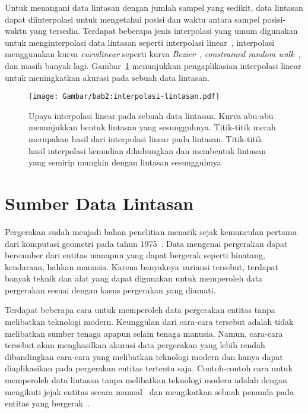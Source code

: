Untuk menangani data lintasan dengan jumlah sampel yang sedikit, data lintasan dapat diinterpolasi untuk mengetahui posisi dan waktu antara sampel posisi-waktu yang tersedia. Terdapat beberapa jenis interpolasi yang umum digunakan untuk menginterpolasi data lintasan seperti interpolasi linear~\cite{wiratma:trajectory}, interpolasi menggunakan kurva \textit{curvilinear} seperti kurva \textit{Bezier}~\cite{tremblay:02:curvilinear}, \textit{constrained random walk}~\cite{wentz:02:constrained-random-walk}, dan masih banyak lagi. Gambar~\ref{bab2:interpolasi-lintasan} menunjukkan pengaplikasian interpolasi linear untuk meningkatkan akurasi pada sebuah data lintasan.

\begin{figure}[h]
    \centering
    \captionsetup{width=0.7\textwidth}
    \texttt{[image: Gambar/bab2:interpolasi-lintasan.pdf]}
    \caption[Interpolasi lintasan]{Upaya interpolasi linear pada sebuah data lintasan. Kurva abu-abu menunjukkan bentuk lintasan yang sesungguhnya. Titik-titik merah merupakan hasil dari interpolasi linear pada lintasan. Titik-titik hasil interpolasi kemudian dihubungkan dan membentuk lintasan yang semirip mungkin dengan lintasan sesungguhnya}
    \label{bab2:interpolasi-lintasan}
\end{figure}

\section{Sumber Data Lintasan}
\label{sec:sumber}

Pergerakan sudah menjadi bahan penelitian menarik sejak kemunculan pertama dari komputasi geometri pada tahun 1975~\cite{shamos:02:computational-geometry}. Data mengenai pergerakan dapat bersumber dari entitas manapun yang dapat bergerak seperti binatang, kendaraan, bahkan manusia. Karena banyaknya variansi tersebut, terdapat banyak teknik dan alat yang dapat digunakan untuk memperoleh data pergerakan sesuai dengan kasus pergerakan yang diamati.

Terdapat beberapa cara untuk memperoleh data pergerakan entitas tanpa melibatkan teknologi modern. Keunggulan dari cara-cara tersebut adalah tidak melibatkan sumber tenaga apapun selain tenaga manusia. Namun, cara-cara tersebut akan menghasilkan akurasi data pergerakan yang lebih rendah dibandingkan cara-cara yang melibatkan teknologi modern dan hanya dapat diaplikasikan pada pergerakan entitas tertentu saja. Contoh-contoh cara untuk memperoleh data lintasan tanpa melibatkan teknologi modern adalah dengan mengikuti jejak entitas secara manual~\cite{stickel:02:turtle} dan mengikatkan sebuah penanda pada entitas yang bergerak~\cite{velden:02:cranes}.

